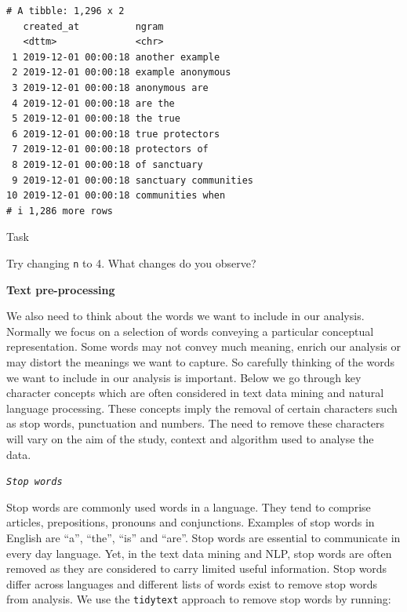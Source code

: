\documentclass[
  letterpaper,
  DIV=11,
  numbers=noendperiod]{scrreprt}
\begin{document}
\begin{verbatim}
# A tibble: 1,296 x 2
   created_at          ngram                
   <dttm>              <chr>                
 1 2019-12-01 00:00:18 another example      
 2 2019-12-01 00:00:18 example anonymous    
 3 2019-12-01 00:00:18 anonymous are        
 4 2019-12-01 00:00:18 are the              
 5 2019-12-01 00:00:18 the true             
 6 2019-12-01 00:00:18 true protectors      
 7 2019-12-01 00:00:18 protectors of        
 8 2019-12-01 00:00:18 of sanctuary         
 9 2019-12-01 00:00:18 sanctuary communities
10 2019-12-01 00:00:18 communities when     
# i 1,286 more rows
\end{verbatim}

\begin{tcolorbox}[enhanced jigsaw, arc=.35mm, opacityback=0, leftrule=.75mm, bottomrule=.15mm, titlerule=0mm, opacitybacktitle=0.6, left=2mm, colframe=quarto-callout-tip-color-frame, rightrule=.15mm, colback=white, bottomtitle=1mm, toprule=.15mm, breakable, title=\textcolor{quarto-callout-tip-color}{\faLightbulb}\hspace{0.5em}{Tip}, toptitle=1mm, coltitle=black, colbacktitle=quarto-callout-tip-color!10!white]

Task

Try changing \texttt{n} to 4. What changes do you observe?

\end{tcolorbox}

\textbf{Text pre-processing}

We also need to think about the words we want to include in our
analysis. Normally we focus on a selection of words conveying a
particular conceptual representation. Some words may not convey much
meaning, enrich our analysis or may distort the meanings we want to
capture. So carefully thinking of the words we want to include in our
analysis is important. Below we go through key character concepts which
are often considered in text data mining and natural language
processing. These concepts imply the removal of certain characters such
as stop words, punctuation and numbers. The need to remove these
characters will vary on the aim of the study, context and algorithm used
to analyse the data.

\emph{\texttt{Stop\ words}}

Stop words are commonly used words in a language. They tend to comprise
articles, prepositions, pronouns and conjunctions. Examples of stop
words in English are ``a'', ``the'', ``is'' and ``are''. Stop words are
essential to communicate in every day language. Yet, in the text data
mining and NLP, stop words are often removed as they are considered to
carry limited useful information. Stop words differ across languages and
different lists of words exist to remove stop words from analysis. We
use the \texttt{tidytext} approach to remove stop words by running:
\end{document}
